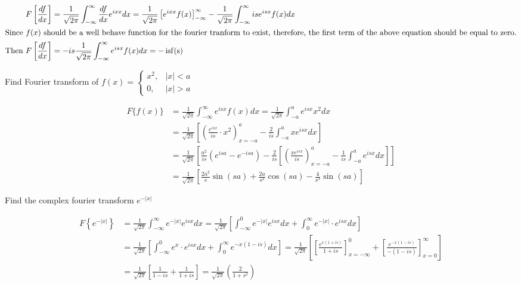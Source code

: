 \begin{answer}
	\begin{align*}
	F\left[\frac{d f}{d x}\right]&=\frac{1}{\sqrt{2 \pi}} \int_{-\infty}^{\infty} \frac{d f}{d x} e^{i x x} d x=\frac{1}{\sqrt{2 \pi}}\left[e^{i x x} f(x)\right]_{-\infty}^{\infty}-\frac{1}{\sqrt{2 \pi}} \int_{-\infty}^{\infty} i s e^{i s x} f(x) d x\\
	\intertext{Since $f(x)$ should be a well behave function for the fourier tranform to exist, therefore, the first term of the above equation should be equal to zero.}
	\text{Then }F\left[\frac{d f}{d x}\right]&=-i s \frac{1}{\sqrt{2 \pi}} \int_{-\infty}^{\infty} e^{i s x} f(x) d x=-\operatorname{isf}(\mathrm{s})
	\end{align*}
\end{answer}
\begin{exercise}
	Find Fourier transform of $f(x)= \begin{cases}x^{2}, & |x|<a \\ 0, & |x|>a\end{cases}$
\end{exercise}
\begin{answer}
	\begin{align*}
	F\{f(x)\} &=\frac{1}{\sqrt{2 \pi}} \int_{-\infty}^{\infty} e^{i s x} f(x) d x=\frac{1}{\sqrt{2 \pi}} \int_{-a}^{a} e^{i s x} x^{2} d x \\
	&=\frac{1}{\sqrt{2 \pi}}\left[\left(\frac{e^{i s x}}{i s} \cdot x^{2}\right)_{x=-a}^{a}-\frac{2}{i s} \int_{-a}^{a} x e^{i s x} d x\right] \\
	&=\frac{1}{\sqrt{2 \pi}}\left[\frac{a^{2}}{i s}\left(e^{i s a}-e^{-i s a}\right)-\frac{2}{i s}\left[\left(\frac{x e^{i s x}}{i s}\right)_{x=-a}^{a}-\frac{1}{i s} \int_{-a}^{a} e^{i s x} d x\right]\right]\\
	&=\frac{1}{\sqrt{2 \pi}}\left[\frac{2 a^{2}}{s} \sin (s a)+\frac{2 a}{s^{2}} \cos (s a)-\frac{4}{s^{3}} \sin (s a)\right]
	\end{align*}
\end{answer}
\begin{exercise}
	Find the complex fourier transform $e^{-|x|}$
\end{exercise}
\begin{answer}
	\begin{align*}
	F\left\{e^{-|x|}\right\}&=\frac{1}{\sqrt{2 \pi}} \int_{-\infty}^{\infty} e^{-|x|} e^{i s x} d x=\frac{1}{\sqrt{2 \pi}}\left[\int_{-\infty}^{0} e^{-|x|} e^{i s x} d x+\int_{0}^{\infty} e^{-|x|} \cdot e^{i s x} d x\right]\\
	&=\frac{1}{\sqrt{2 \pi}}\left[\int_{-\infty}^{0} e^{x} \cdot e^{i s x} d x+\int_{0}^{\infty} e^{-x(1-i s)} d x\right]=\frac{1}{\sqrt{2 \pi}}\left[\left[\frac{e^{x(1+i s)}}{1+i s}\right]_{x=-\infty}^{0}+\left[\frac{e^{-x(1-i s)}}{-(1-i s)}\right]_{x=0}^{\infty}\right] \\
	&=\frac{1}{\sqrt{2 \pi}}\left[\frac{1}{1-i s}+\frac{1}{1+i s}\right]=\frac{1}{\sqrt{2 \pi}}\left(\frac{2}{1+s^{2}}\right)
	\end{align*}
\end{answer}
